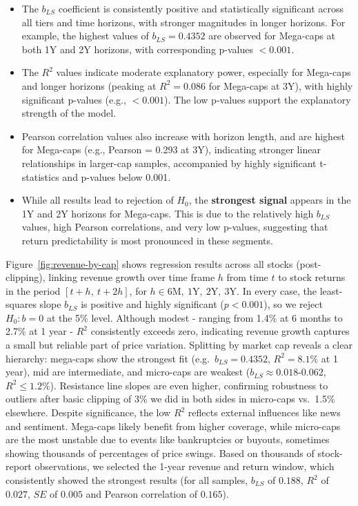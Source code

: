 \documentclass[11pt]{article}
\begin{document}
\begin{itemize}
    \item The $b_{LS}$ coefficient is consistently positive and statistically significant across all tiers and time horizons, with stronger magnitudes in longer horizons. For example, the highest values of $b_{LS} = 0.4352$ are observed for Mega-caps at both 1Y and 2Y horizons, with corresponding p-values $<0.001$.
    
    \item The $R^2$ values indicate moderate explanatory power, especially for Mega-caps and longer horizons (peaking at $R^2 = 0.086$ for Mega-caps at 3Y), with highly significant p-values (e.g., $<0.001$). The low p-values support the explanatory strength of the model.

    \item Pearson correlation values also increase with horizon length, and are highest for Mega-caps (e.g., Pearson = 0.293 at 3Y), indicating stronger linear relationships in larger-cap samples, accompanied by highly significant t-statistics and p-values below 0.001.

    \item While all results lead to rejection of $H_0$, the \textbf{strongest signal} appears in the 1Y and 2Y horizons for Mega-caps. This is due to the relatively high $b_{LS}$ values, high Pearson correlations, and very low p-values, suggesting that return predictability is most pronounced in these segments.
\end{itemize}

Figure~\ref{fig:revenue-by-cap} shows regression results across all stocks (post-clipping), linking revenue growth over time frame $h$ from time $t$ to stock returns in the period $[t+h,\ t+2h]$, for $h \in {6\text{M},\ 1\text{Y},\ 2\text{Y},\ 3\text{Y}}$.
In every case, the least-squares slope $b_{LS}$ is positive and highly significant ($p<0.001$), so we reject $H_0\colon b=0$ at the 5\% level.
Although modest - ranging from 1.4\% at 6 months to 2.7\% at 1 year - $R^2$ consistently exceeds zero, indicating revenue growth captures a small but reliable part of price variation.
Splitting by market cap reveals a clear hierarchy: mega-caps show the strongest fit (e.g.\ $b_{LS}=0.4352$, $R^2=8.1\%$ at 1 year), mid are intermediate, and micro-caps are weakest ($b_{LS}\approx0.018$-0.062, $R^2\le1.2\%$).
Resistance line slopes are even higher, confirming robustness to outliers after basic clipping of 3\% we did in both sides in micro-caps vs.\ 1.5\% elsewhere.
Despite significance, the low $R^2$ reflects external influences like news and sentiment.
Mega-caps likely benefit from higher coverage, while micro-caps are the most unstable due to events like bankruptcies or buyouts, sometimes showing thousands of percentages of price swings.
Based on thousands of stock-report observations, we selected the 1-year revenue and return window, which consistently showed the strongest results (for all samples, $b_{LS}$ of $0.188$, $R^2$ of $0.027$, $SE$ of $0.005$ and Pearson correlation of $0.165$).
\end{document}

